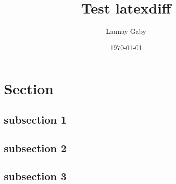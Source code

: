 \documentclass[11pt, a4paper]{article}
\author{Launay Gaby}
\title{Test latexdiff}
\date{\today}
\begin{document}
\maketitle



\section{Section}
\subsection{subsection 1}
\subsection{subsection 2}
\subsection{subsection 3}
\end{document}
